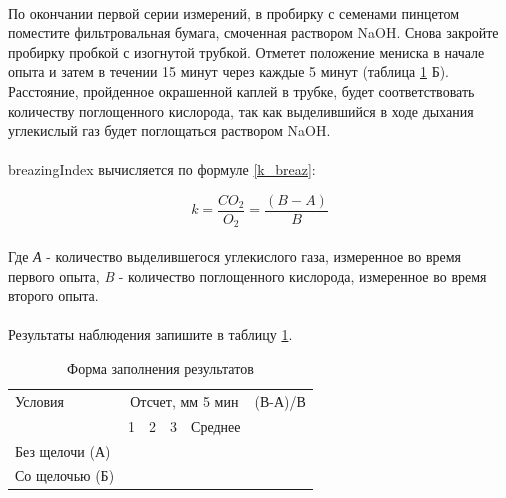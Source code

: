 \paragraph*{}По окончании первой серии измерений, в пробирку с семенами пинцетом поместите фильтровальная бумага, смоченная раствором NaOH. Снова закройте пробирку пробкой с изогнутой трубкой. Отметет положение мениска в начале опыта и затем в течении 15 минут через каждые 5 минут (таблица \ref{table_breezing_seeds} Б). Расстояние, пройденное окрашенной каплей в трубке, будет соответствовать количеству поглощенного кислорода, так как выделившийся в ходе дыхания  углекислый газ будет поглощаться раствором NaOH.

\paragraph*{}\gls{breazingIndex} вычисляется по формуле \ref{k_breaz}:

\begin{equation}
  \label{k_breaz}
  k = \frac{CO{_2}}{O{_2}} = \frac{(B - A)}{B}
\end{equation} 

\paragraph*{}Где \textit{А} - количество выделившегося углекислого газа, измеренное во время первого опыта, \textit{B} - количество поглощенного кислорода, измеренное во время второго опыта.

\paragraph*{}Результаты наблюдения запишите в таблицу \ref{table_breezing_seeds}.

\begin{table}
\centering
	\label{table_breezing_seeds}
	\caption{Форма заполнения результатов}
	\begin{tabularx}{\linewidth}{|p{5cm}|X|X|X|X|X|}
		\hline Условия & \multicolumn{4}{|c|}{Отсчет, мм 5 мин} & (В-А)/В \\ \cline{2-6}
		               &       1      &     2   &   3 & Среднее &         \\ 
		\hline Без щелочи (А)  &      &         &     &         &         \\
		\hline Со щелочью (Б)  &      &         &     &         &         \\
		\hline
	
	\end{tabularx}
\end{table}

